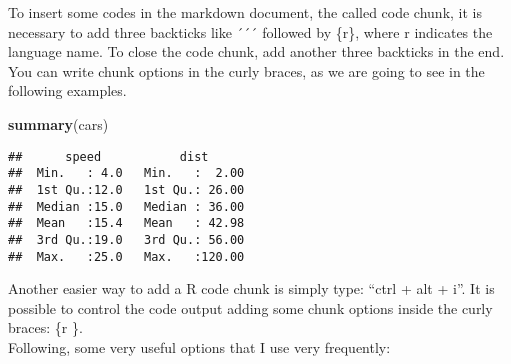 \documentclass[]{article}
\newenvironment{Shaded}{\begin{snugshade}}{\end{snugshade}}
\newcommand{\KeywordTok}[1]{\textcolor[rgb]{0.13,0.29,0.53}{\textbf{#1}}}
\newcommand{\NormalTok}[1]{#1}
\begin{document}
To insert some codes in the markdown document, the called code chunk, it
is necessary to add three backticks like ´´´ followed by \{r\}, where r
indicates the language name. To close the code chunk, add another three
backticks in the end. You can write chunk options in the curly braces,
as we are going to see in the following examples.

\begin{Shaded}
\begin{Highlighting}[]
\KeywordTok{summary}\NormalTok{(cars)}
\end{Highlighting}
\end{Shaded}

\begin{verbatim}
##      speed           dist       
##  Min.   : 4.0   Min.   :  2.00  
##  1st Qu.:12.0   1st Qu.: 26.00  
##  Median :15.0   Median : 36.00  
##  Mean   :15.4   Mean   : 42.98  
##  3rd Qu.:19.0   3rd Qu.: 56.00  
##  Max.   :25.0   Max.   :120.00
\end{verbatim}

Another easier way to add a R code chunk is simply type: ``ctrl + alt +
i''. It is possible to control the code output adding some chunk options
inside the curly braces: \{r \}.\\
Following, some very useful options that I use very frequently:
\end{document}
